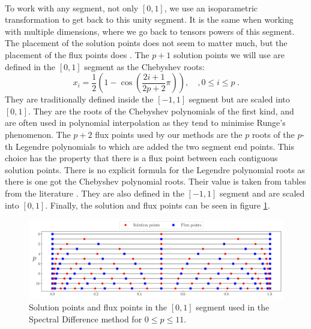       \paragraph{}
      To work with any segment, not only $\left[0, 1\right]$, we use an isoparametric transformation to get back to this unity segment.
      It is the same when working with multiple dimensions, where we go back to tensors powers of this segment.
      The placement of the solution points does not seem to matter much, but the placement of the flux points does \cite{VandenAbeeleLacorWang2008}.
      The $p + 1$ solution points we will use are defined in the $\left[0, 1\right]$ segment as the Chebyshev roots:
      \begin{equation}
        x_i = \frac{1}{2} \left(1 - \cos\left(\frac{2i + 1}{2p + 2} \pi\right)\right), \quad, 0 \leq i \leq p \ .
      \end{equation}
      They are traditionally defined inside the $\left[-1, 1\right]$ segment but are scaled into $\left[0, 1\right]$.
      They are the roots of the Chebyshev polynomials of the first kind, and are often used in polynomial interpolation as they tend to minimise Runge's phenomenon.
      The $p + 2$ flux points used by our methods are the $p$ roots of the $p$-th Legendre polynomials to which are added the two segment end points.
      This choice has the property that there is a flux point between each contiguous solution points.
      There is no explicit formula for the Legendre polynomial roots as there is one got the Chebyshev polynomial roots.
      Their value is taken from tables from the literature .
      They are also defined in the $\left[-1, 1\right]$ segment and are scaled into $\left[0, 1\right]$.
      Finally, the solution and flux points can be seen in figure \ref{fig:sd_points}.

      \begin{figure}
        \centering
        \includegraphics[width=\textwidth]{figures/sd_points.png}
        \caption{Solution points and flux points in the $\left[0, 1\right]$ segment used in the Spectral Difference method for $0 \leq p \leq 11$.}
        \label{fig:sd_points}
      \end{figure}

